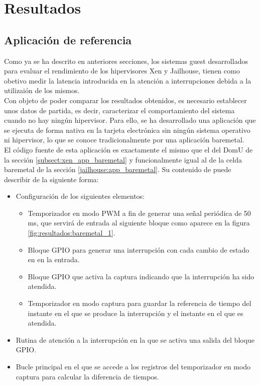\chapter{Resultados}

\section{Aplicación de referencia}

Como ya se ha descrito en anteriores secciones, los sistemas guest desarrollados para evaluar el rendimiento de los hipervisores Xen y Jailhouse, tienen como obetivo medir la latencia introducida en la atención a interrupciones debida a la utilizaión de los mismos. \\
Con objeto de poder comparar los resultados obtenidos, es necesario establecer unos datos de partida, es decir, caracterizar el comportamiento del sistema cuando no hay ningún hipervisor. Para ello, se ha desarrollado una aplicación que se ejecuta de forma nativa en la tarjeta electrónica sin ningún sistema operativo ni hipervisor, lo que se conoce tradicionalmente por una aplicación baremetal.\\

El código fuente de esta aplicación es exactamente el mismo que el del DomU de la sección \ref{subsect:xen_app_baremetal} y funcionalmente igual al de la celda baremetal de la sección \ref{jailhouse:app_baremetal}. Su contenido de puede describir de la siguiente forma:
\begin{itemize}
  \item Configuración de los siguientes elementos:
  \begin{itemize}
    \item Temporizador en modo \acrshort{PWM} a fin de generar una señal periódica de 50 ms, que servirá de entrada al siguiente bloque como aparece en la figura \ref{fig:resultados:baremetal_1}.
    \item Bloque \acrshort{GPIO} para generar una interrupción con cada cambio de estado en en la entrada.
    \item Bloque \acrshort{GPIO} que activa la captura indicando que la interrupción ha sido atendida.
    \item Temporizador en modo captura para guardar la referencia de tiempo del instante en el que se produce la interrupción y el instante en el que es atendida.
  \end{itemize}
  \item Rutina de atención a la interrupción en la que se activa una salida del bloque \acrshort{GPIO}.
  \item Bucle principal en el que se accede a los registros del temporizador en modo captura para calcular la diferencia de tiempos.\\
\end{itemize}

